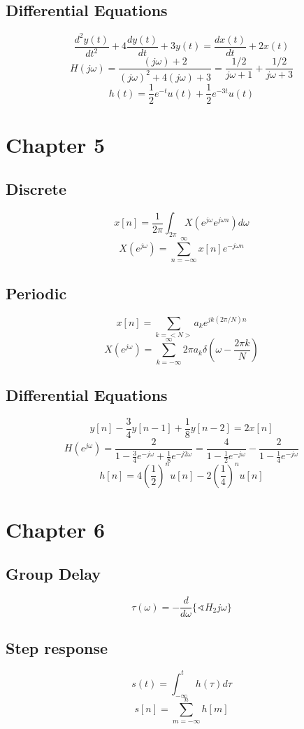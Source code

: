 \documentclass[landscape,a4paper]{article}
\begin{document}
\begin{multicols}{3}
\subsection*{Differential Equations}

$$\frac{d^2y(t)}{dt^2}+4\frac{dy(t)}{dt}+3y(t)=\frac{dx(t)}{dt}+2x(t)$$
$$H(j\omega)=\frac{(j\omega)+2}{(j\omega)^2+4(j\omega)+3}=\frac{1/2}{j\omega+1}+\frac{1/2}{j\omega+3}$$
$$h(t)=\frac{1}{2}e^{-t}u(t)+\frac{1}{2}e^{-3t}u(t)$$

\section*{Chapter 5}

\subsection*{Discrete}
$$x[n]=\frac{1}{2\pi}\int_{2\pi}X(e^{j\omega}e^{j\omega n})d\omega$$
$$X(e^{j\omega})=\sum_{n=-\infty}^{\infty}x[n]e^{-j\omega n}$$

\subsection*{Periodic}
$$x[n]=\sum_{k=<N>}a_ke^{jk(2\pi/N)n}$$
$$X(e^{j\omega})=\sum_{k=-\infty}^{\infty}2\pi a_k\delta\left(\omega-\frac{2\pi k}{N}\right)$$

\subsection*{Differential Equations}
$$y[n]-\frac{3}{4}y[n-1]+\frac{1}{8}y[n-2]=2x[n]$$
$$H(e^{j\omega})=\frac{2}{1-\frac{3}{4}e^{-j\omega}+\frac{1}{8}e^{-j2\omega}}=\frac{4}{1-\frac{1}{2}e^{-j\omega}}-\frac{2}{1-\frac{1}{4}e^{-j\omega}}
$$
$$h[n]=4\left(\frac{1}{2}\right)^nu[n]-2\left(\frac{1}{4}\right)^nu[n]$$

\section*{Chapter 6}

\subsection*{Group Delay}
$$\tau(\omega)=-\frac{d}{d\omega}\{\sphericalangle H_2{j\omega}\}$$

\subsection*{Step response}
$$s(t)=\int_{-\infty}^th(\tau)d\tau$$
$$s[n]=\sum_{m=-\infty}^{n}h[m]$$


\end{multicols}
\end{document}
